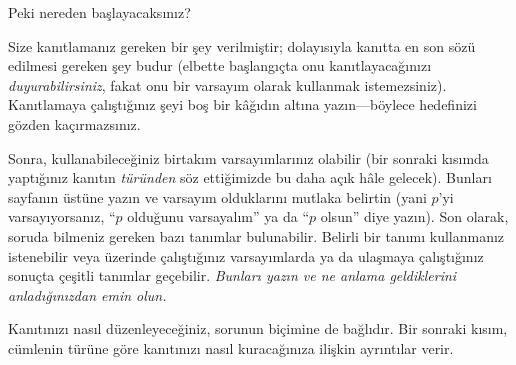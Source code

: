 



Peki nereden başlayacaksınız?

Size kanıtlamanız gereken bir şey verilmiştir; dolayısıyla kanıtta en
son sözü edilmesi gereken şey budur (elbette başlangıçta onu
kanıtlayacağınızı \emph{duyurabilirsiniz}, fakat onu bir varsayım olarak
kullanmak istemezsiniz). Kanıtlamaya çalıştığınız şeyi boş bir kâğıdın
altına yazın---böylece hedefinizi gözden kaçırmazsınız.

Sonra, kullanabileceğiniz birtakım varsayımlarınız olabilir (bir
sonraki kısımda yaptığınız kanıtın \emph{türünden} söz ettiğimizde bu
daha açık hâle gelecek). Bunları sayfanın üstüne yazın ve varsayım
olduklarını mutlaka belirtin (yani $p$'yi varsayıyorsanız, ``$p$ olduğunu
varsayalım'' ya da ``$p$ olsun'' diye yazın). Son olarak, soruda
bilmeniz gereken bazı tanımlar bulunabilir. Belirli bir tanımı
kullanmanız istenebilir veya üzerinde çalıştığınız varsayımlarda ya da
ulaşmaya çalıştığınız sonuçta çeşitli tanımlar geçebilir. \emph{Bunları
yazın ve ne anlama geldiklerini anladığınızdan emin olun.}

Kanıtınızı nasıl düzenleyeceğiniz, sorunun biçimine de bağlıdır. Bir
sonraki kısım, cümlenin türüne göre kanıtınızı nasıl kuracağınıza
ilişkin ayrıntılar verir.

